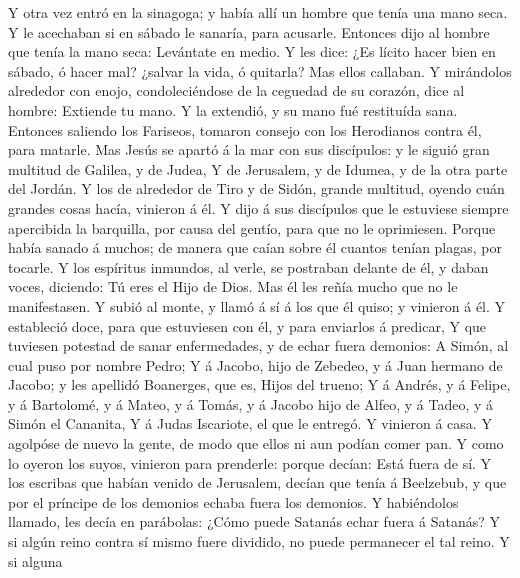  Y otra vez entró en la sinagoga; y había allí un hombre
que tenía una mano seca.  Y le acechaban si en sábado le
sanaría, para acusarle.  Entonces dijo al hombre que tenía
la mano seca: Levántate en medio.  Y les dice: ¿Es lícito
hacer bien en sábado, ó hacer mal? ¿salvar la vida, ó quitarla? Mas
ellos callaban.  Y mirándolos alrededor con enojo,
condoleciéndose de la ceguedad de su corazón, dice al hombre: Extiende
tu mano. Y la extendió, y su mano fué restituída sana. 
Entonces saliendo los Fariseos, tomaron consejo con los Herodianos
contra él, para matarle.  Mas Jesús se apartó á la mar con
sus discípulos: y le siguió gran multitud de Galilea, y de Judea,
 Y de Jerusalem, y de Idumea, y de la otra parte del
Jordán. Y los de alrededor de Tiro y de Sidón, grande multitud, oyendo
cuán grandes cosas hacía, vinieron á él.  Y dijo á sus
discípulos que le estuviese siempre apercibida la barquilla, por causa
del gentío, para que no le oprimiesen.  Porque había
sanado á muchos; de manera que caían sobre él cuantos tenían plagas, por
tocarle.  Y los espíritus inmundos, al verle, se
postraban delante de él, y daban voces, diciendo: Tú eres el Hijo de
Dios.  Mas él les reñía mucho que no le manifestasen.
 Y subió al monte, y llamó á sí á los que él quiso; y
vinieron á él.  Y estableció doce, para que estuviesen
con él, y para enviarlos á predicar,  Y que tuviesen
potestad de sanar enfermedades, y de echar fuera demonios:
 A Simón, al cual puso por nombre Pedro; 
Y á Jacobo, hijo de Zebedeo, y á Juan hermano de Jacobo; y les apellidó
Boanerges, que es, Hijos del trueno;  Y á Andrés, y á
Felipe, y á Bartolomé, y á Mateo, y á Tomás, y á Jacobo hijo de Alfeo, y
á Tadeo, y á Simón el Cananita,  Y á Judas Iscariote, el
que le entregó. Y vinieron á casa.  Y agolpóse de nuevo
la gente, de modo que ellos ni aun podían comer pan.  Y
como lo oyeron los suyos, vinieron para prenderle: porque decían: Está
fuera de sí.  Y los escribas que habían venido de
Jerusalem, decían que tenía á Beelzebub, y que por el príncipe de los
demonios echaba fuera los demonios.  Y habiéndolos
llamado, les decía en parábolas: ¿Cómo puede Satanás echar fuera á
Satanás?  Y si algún reino contra sí mismo fuere
dividido, no puede permanecer el tal reino.  Y si alguna
